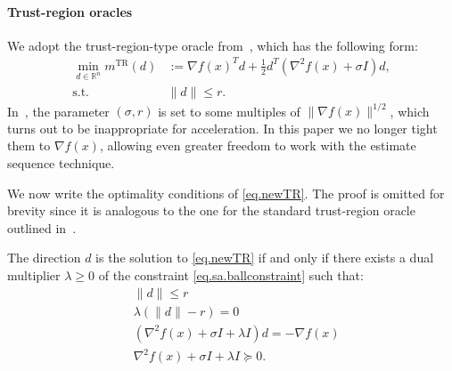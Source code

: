 \documentclass{article}
\begin{document}
\paragraph{Trust-region oracles}
We adopt the trust-region-type oracle from~\citet{jiang2024nonconvexityuniversaltrustregionmethod}, which has the following form:
\begin{subequations}\label{eq.newTR}
    \begin{align}
        \min_{d \in \mathbb{R}^n} m^{\text{TR}}(d) &:=\nabla f(x)^T d + \tfrac{1}{2}d^T (\nabla^2 f(x) + \sigma I) d, \\\label{eq.sa.ballconstraint} \operatorname{s.t.} ~& \|d\| \le r.
    \end{align}
\end{subequations}
In~\citet{jiang2024nonconvexityuniversaltrustregionmethod}, the parameter $(\sigma, r)$ is set to some multiples of $\|\nabla f(x)\|^{1/2}$, which turns out to be inappropriate for acceleration. In this paper we no longer tight them to $\nabla f(x)$, allowing even greater freedom to work with the estimate sequence technique.

We now write the optimality conditions of \eqref{eq.newTR}. The proof is omitted for brevity since it is analogous to the one for the standard trust-region oracle outlined in~\citet[Section 3]{conn2000trust}.
\begin{lemma}\label{lem.optimal condition}
    The direction $d$ is the solution to \eqref{eq.newTR} if and only if there exists a dual multiplier $\lambda \geq 0$ of the constraint \eqref{eq.sa.ballconstraint} such that: \begin{subequations}\label{eq.sa}
        \begin{align}
            \label{eq.optcond primal}
             & \| d\| \leq r                                                       \\
            \label{eq.optcond coml slack}
             & \lambda \left(\|d\|-r \right)=0                                     \\ \label{eq.optcond firstorder}
             & \left(\nabla^2 f(x) + \sigma I + \lambda I \right) d = -\nabla f(x) \\
            \label{eq.optcond secondorder}
             & \nabla^2 f(x) + \sigma I + \lambda I \succeq 0.
        \end{align}
    \end{subequations}
\end{lemma}
\end{document}
